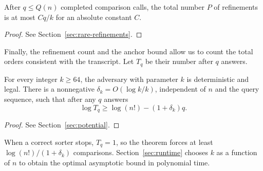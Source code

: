 \begin{lemma}\label{lem:rare-refinements}
After $q\le Q(n)$ completed comparison calls, the total number $P$ of refinements
is at most $Cq/k$ for an absolute constant $C$.
\end{lemma}
\begin{proof}
See Section~\ref{sec:rare-refinements}.
\end{proof}

Finally, the refinement count and the anchor bound allow us to count
the total orders consistent with the transcript. Let $T_q$ be their
number after $q$ answers.

\begin{theorem}\label{thm:fixed-stage}
For every integer $k\ge64$, the adversary with parameter $k$ is
deterministic and legal. There is a nonnegative
$\delta_k=O(\log k/k)$, independent of $n$ and the query sequence,
such that after any $q$ answers
\begin{equation}\label{eq:prefix-orders}
\log T_q\ge\log(n!)-(1+\delta_k)q.
\end{equation}
\end{theorem}
\begin{proof}
See Section~\ref{sec:potential}.
\end{proof}

When a correct sorter stops, $T_q=1$, so the theorem forces at least
$\log(n!)/(1+\delta_k)$ comparisons. Section~\ref{sec:runtime} chooses
$k$ as a function of $n$ to obtain the optimal asymptotic bound in
polynomial time.
